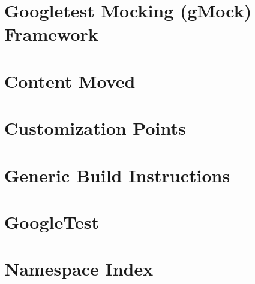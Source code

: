 \let\mypdfximage\pdfximage\def\pdfximage{\immediate\mypdfximage}\documentclass[twoside]{book}
\newcommand{\+}{\discretionary{\mbox{\scriptsize$\hookleftarrow$}}{}{}}
\begin{document}
\chapter{Googletest Mocking (g\+Mock) Framework}
\label{md__home_mary_VegaProgramEngineering_2024_build__deps_googletest-src_googlemock_README}

\chapter{Content Moved}
\label{md__home_mary_VegaProgramEngineering_2024_build__deps_googletest-src_googletest_docs_README}

\chapter{Customization Points}
\label{md__home_mary_VegaProgramEngineering_2024_build__deps_googletest-src_googletest_include_gtest_internal_custom_README}

\chapter{Generic Build Instructions}
\label{md__home_mary_VegaProgramEngineering_2024_build__deps_googletest-src_googletest_README}

\chapter{Google\+Test}
\label{md__home_mary_VegaProgramEngineering_2024_build__deps_googletest-src_README}

\chapter{Namespace Index}

\end{document}
